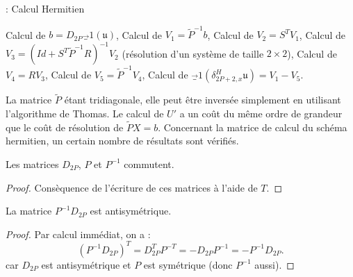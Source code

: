 \begin{center}
\begin{minipage}[H]{12cm}
  \begin{algorithm}[H]
    \caption{: Calcul Hermitien}\label{alg:SH}
    \begin{algorithmic}[1]
    \State Calcul de $b = D_{2P} \vec_1 (\mathfrak{u})$,
	\State Calcul de $V_1 = \tilde{P}^{-1} b$,
	\State Calcul de $V_2 = S^T V_1$,
	\State Calcul de $V_3 = (Id + S^T \tilde{P}^{-1}R)^{-1} V_2$ (résolution d'un système de taille $2 \times 2$),
	\State Calcul de $V_4 = R V_3$,
	\State Calcul de $V_5 = \tilde{P}^{-1} V_4$,
	\State Calcul de $\vec_1 (\delta_{2P+2,x}^H \mathfrak{u}) = V_1 - V_5$.
    \end{algorithmic}
    \end{algorithm}
\end{minipage}
\end{center}
La matrice $\tilde{P}$ étant tridiagonale, elle peut être inversée simplement en utilisant l'algorithme de Thomas. Le calcul de $U'$ a un coût du même ordre de grandeur que le coût de résolution de $\tilde{P}X = b$. Concernant la matrice de calcul du schéma hermitien, un certain nombre de résultats sont vérifiés.

\begin{proposition}
Les matrices $D_{2P}$, $P$ et $P^{-1}$ commutent.
\end{proposition}

\begin{proof}
Consèquence de l'écriture de ces matrices à l'aide de $T$.
\end{proof}

\begin{proposition}
La matrice $P^{-1}D_{2P}$ est antisymétrique.
\end{proposition}

\begin{proof}
Par calcul immédiat, on a :
\begin{equation}
(P^{-1}D_{2P})^T = D_{2P}^T P^{-T} = - D_{2P} P^{-1} = - P^{-1} D_{2P}.
\end{equation}
car $D_{2P}$ est antisymétrique et $P$ est symétrique (donc $P^{-1}$ aussi). 
\end{proof}

























